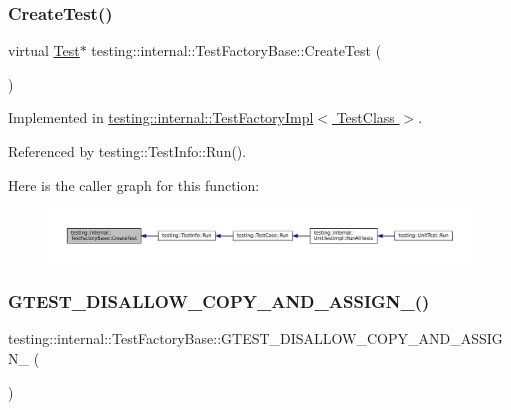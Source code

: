 \subsubsection{\texorpdfstring{Create\+Test()}{CreateTest()}}
{\footnotesize\ttfamily virtual \hyperlink{classtesting_1_1Test}{Test}$\ast$ testing\+::internal\+::\+Test\+Factory\+Base\+::\+Create\+Test (\begin{DoxyParamCaption}{ }\end{DoxyParamCaption})\hspace{0.3cm}{\ttfamily [pure virtual]}}



Implemented in \hyperlink{classtesting_1_1internal_1_1TestFactoryImpl_a8860c89bdb06450a5d5e8137ebd9d775}{testing\+::internal\+::\+Test\+Factory\+Impl$<$ Test\+Class $>$}.



Referenced by testing\+::\+Test\+Info\+::\+Run().

Here is the caller graph for this function\+:
\nopagebreak
\begin{figure}[H]
\begin{center}
\leavevmode
\includegraphics[width=350pt]{classtesting_1_1internal_1_1TestFactoryBase_a07ac3ca0b196cdb092da0bb186b7c030_icgraph}
\end{center}
\end{figure}
\mbox{\label{classtesting_1_1internal_1_1TestFactoryBase_a85d7cb90e00f165e61a008be77293fb4}} 
\subsubsection{\texorpdfstring{G\+T\+E\+S\+T\+\_\+\+D\+I\+S\+A\+L\+L\+O\+W\+\_\+\+C\+O\+P\+Y\+\_\+\+A\+N\+D\+\_\+\+A\+S\+S\+I\+G\+N\+\_\+()}{GTEST\_DISALLOW\_COPY\_AND\_ASSIGN\_()}}
{\footnotesize\ttfamily testing\+::internal\+::\+Test\+Factory\+Base\+::\+G\+T\+E\+S\+T\+\_\+\+D\+I\+S\+A\+L\+L\+O\+W\+\_\+\+C\+O\+P\+Y\+\_\+\+A\+N\+D\+\_\+\+A\+S\+S\+I\+G\+N\+\_\+ (\begin{DoxyParamCaption}\item[{\hyperlink{classtesting_1_1internal_1_1TestFactoryBase}{Test\+Factory\+Base}}]{ }\end{DoxyParamCaption})\hspace{0.3cm}{\ttfamily [private]}}



